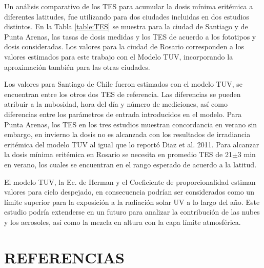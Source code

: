 \documentclass[10pt,twocolumn]{article}
\begin{document}
Un análisis comparativo de los TES para acumular la dosis mínima eritémica a diferentes latitudes, fue utilizando para dos ciudades incluidas en dos estudios distintos.\cite{Diaz2011,cabrera_radiacion_2005}  En la Tabla \ref{table:TES} se muestra para la ciudad de Santiago y de Punta Arenas, las tasas de dosis medidas y los TES de acuerdo a los fototipos y dosis consideradas. Los valores para la ciudad de Rosario corresponden a los valores estimados para este trabajo con el Modelo TUV, incorporando la aproximación también para las otras ciudades.

Los valores para Santiago de Chile fueron estimados con el modelo TUV, se encuentran entre los otros dos TES de referencia. Las diferencias se pueden atribuir a la nubosidad, hora del día y número de mediciones, así como diferencias entre los parámetros de entrada introducidos en el modelo. Para Punta Arenas, los TES en los tres estudios muestran concordancia en verano sin embargo, en invierno la dosis no es alcanzada con los resultados de irradiancia eritémica del modelo TUV al igual que lo reportó Diaz et al. 2011. Para alcanzar la dosis mínima eritémica en Rosario se necesita en promedio TES de 21$\pm$3 min en verano, los cuales se encuentran en el rango esperado de acuerdo a la latitud.

El modelo TUV, la Ec. de Herman y el Coeficiente de proporcionalidad estiman valores para cielo despejado, en consecuencia podrían ser considerados como un límite superior para la exposición a la radiación solar UV a lo largo del año. Este estudio podría extenderse en un futuro para analizar la contribución de las nubes y los aerosoles,\cite{Kim2020} así como la mezcla en altura con la capa límite atmosférica.
\section{REFERENCIAS}
\renewcommand{\refname}{}

\end{document}
